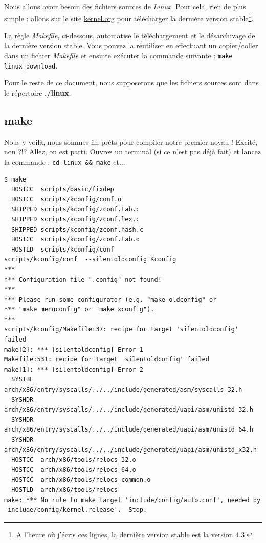 \documentclass[a4paper]{article}
\begin{document}
Nous allons avoir besoin des fichiers sources de \textit{Linux}. Pour cela, rien de plus simple : allons sur le site \href{http://www.kernel.org}{kernel.org} pour télécharger la dernière version stable\footnote{A l'heure où j'écris ces lignes, la dernière version stable est la version 4.3.}.
\bigskip

La règle \textit{Makefile}, ci-dessous, automatise le téléchargement et le désarchivage de la dernière version stable. Vous pouvez la réutiliser en effectuant un copier/coller dans un fichier \textit{Makefile} et ensuite exécuter la commande suivante : \lstset{language=sh}\lstinline{make linux_download}.
\bigskip



Pour le reste de ce document, nous supposerons que les fichiers sources sont dans le répertoire \textbf{./linux}.
\bigskip

\subsection{make}

Nous y voilà, nous sommes fin prêts pour compiler notre premier noyau ! Excité, non ?!? Allez, on est parti. Ouvrez un terminal (si ce n'est pas déjà fait) et lancez la commande : \lstset{language=sh}\lstinline{cd linux && make} et...

\begin{lstlisting}[style=consoleOutputSyle]
$ make
  HOSTCC  scripts/basic/fixdep
  HOSTCC  scripts/kconfig/conf.o
  SHIPPED scripts/kconfig/zconf.tab.c
  SHIPPED scripts/kconfig/zconf.lex.c
  SHIPPED scripts/kconfig/zconf.hash.c
  HOSTCC  scripts/kconfig/zconf.tab.o
  HOSTLD  scripts/kconfig/conf
scripts/kconfig/conf  --silentoldconfig Kconfig
***
*** Configuration file ".config" not found!
***
*** Please run some configurator (e.g. "make oldconfig" or
*** "make menuconfig" or "make xconfig").
***
scripts/kconfig/Makefile:37: recipe for target 'silentoldconfig' failed
make[2]: *** [silentoldconfig] Error 1
Makefile:531: recipe for target 'silentoldconfig' failed
make[1]: *** [silentoldconfig] Error 2
  SYSTBL  arch/x86/entry/syscalls/../../include/generated/asm/syscalls_32.h
  SYSHDR  arch/x86/entry/syscalls/../../include/generated/uapi/asm/unistd_32.h
  SYSHDR  arch/x86/entry/syscalls/../../include/generated/uapi/asm/unistd_64.h
  SYSHDR  arch/x86/entry/syscalls/../../include/generated/uapi/asm/unistd_x32.h
  HOSTCC  arch/x86/tools/relocs_32.o
  HOSTCC  arch/x86/tools/relocs_64.o
  HOSTCC  arch/x86/tools/relocs_common.o
  HOSTLD  arch/x86/tools/relocs
make: *** No rule to make target 'include/config/auto.conf', needed by 'include/config/kernel.release'.  Stop.
\end{lstlisting}
\end{document}
